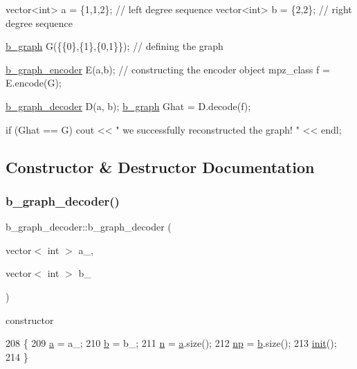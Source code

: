 \begin{DoxyCode}
vector<int> a = \{1,1,2\}; \textcolor{comment}{// left degree sequence }
vector<int> b = \{2,2\}; \textcolor{comment}{// right degree sequence}

\hyperlink{classb__graph}{b\_graph} G(\{\{0\},\{1\},\{0,1\}\}); \textcolor{comment}{// defining the graph}

\hyperlink{classb__graph__encoder}{b\_graph\_encoder} E(a,b); \textcolor{comment}{// constructing the encoder object}
mpz\_class f = E.encode(G);

\hyperlink{classb__graph__decoder}{b\_graph\_decoder} D(a, b);
\hyperlink{classb__graph}{b\_graph} Ghat = D.decode(f);

\textcolor{keywordflow}{if} (Ghat == G)
   cout << \textcolor{stringliteral}{" we successfully reconstructed the graph! "} << endl;
\end{DoxyCode}
 

\subsection{Constructor \& Destructor Documentation}
\mbox{\label{classb__graph__decoder_a2284e65bb4fcdd9356fc6a3109c2a4a7}} 
\subsubsection{\texorpdfstring{b\+\_\+graph\+\_\+decoder()}{b\_graph\_decoder()}}
{\footnotesize\ttfamily b\+\_\+graph\+\_\+decoder\+::b\+\_\+graph\+\_\+decoder (\begin{DoxyParamCaption}\item[{vector$<$ int $>$}]{a\+\_\+,  }\item[{vector$<$ int $>$}]{b\+\_\+ }\end{DoxyParamCaption})}



constructor 


\begin{DoxyCode}
208 \{
209   \hyperlink{classb__graph__decoder_afcf783e4199fb8f9d6828db08bb12333}{a} = a\_;
210   \hyperlink{classb__graph__decoder_a12d1a4a91f342111d2116196cb826317}{b} = b\_;
211   \hyperlink{classb__graph__decoder_a2caddd63df6808c95e2ee738f7c77870}{n} = \hyperlink{classb__graph__decoder_afcf783e4199fb8f9d6828db08bb12333}{a}.size();
212   \hyperlink{classb__graph__decoder_a7eca48cf8793e722d1b29dbdc9fd2dca}{np} = \hyperlink{classb__graph__decoder_a12d1a4a91f342111d2116196cb826317}{b}.size();
213   \hyperlink{classb__graph__decoder_a9498e8aa7391480cc663bffef3718c6b}{init}();
214 \}
\end{DoxyCode}


